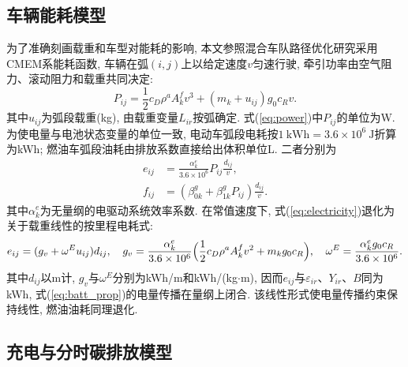\documentclass{setp-new}
\begin{document}
\subsection{车辆能耗模型}

为了准确刻画载重和车型对能耗的影响,
本文参照混合车队路径优化研究\cite{ref:27}采用CMEM系能耗函数\cite{ref:36,ref:47},
车辆在弧$(i,j)$上以给定速度$v$匀速行驶,
牵引功率由空气阻力、滚动阻力和载重共同决定:
\begin{equation}
P_{ij}=\frac12c_D\rho^a A_k^f v^3+(m_k+u_{ij})g_0c_R v.
\label{eq:power}
\end{equation}
其中$u_{ij}$为弧段载重(kg), 由载重变量$L_{ir}$按弧确定.
式(\ref{eq:power})中$P_{ij}$的单位为W. 为使电量与电池状态变量的单位一致,
电动车弧段电耗按$1\ \mathrm{kWh}=3.6\times10^{6}\ \mathrm{J}$折算为kWh;
燃油车弧段油耗由排放系数直接给出体积单位L. 二者分别为
\begin{align}
e_{ij}&=\frac{\alpha_k^e}{3.6\times10^{6}}P_{ij}\frac{d_{ij}}{v}, \label{eq:electricity}\\
f_{ij}&=(\beta_{0k}^g+\beta_{1k}^gP_{ij})\frac{d_{ij}}{v}. \label{eq:fuel}
\end{align}
其中$\alpha_k^e$为无量纲的电驱动系统效率系数.
在常值速度下, 式(\ref{eq:electricity})退化为关于载重线性的按里程电耗式:
\begin{equation}
e_{ij}=(g_v+\omega^E u_{ij})d_{ij},\quad
g_v=\frac{\alpha_k^e}{3.6\times10^{6}}\Bigl(\frac12c_D\rho^a A_k^f v^2+m_k g_0 c_R\Bigr),\quad
\omega^E=\frac{\alpha_k^e g_0 c_R}{3.6\times10^{6}}.
\label{eq:linear_energy}
\end{equation}
其中$d_{ij}$以m计, $g_v$与$\omega^E$分别为kWh/m和kWh/(kg$\cdot$m),
因而$e_{ij}$与$\varepsilon_{ir}$、$Y_{ir}$、$B$同为kWh, 式(\ref{eq:batt_prop})的电量传播在量纲上闭合.
该线性形式使电量传播约束保持线性, 燃油油耗同理退化.

\subsection{充电与分时碳排放模型}
\end{document}
